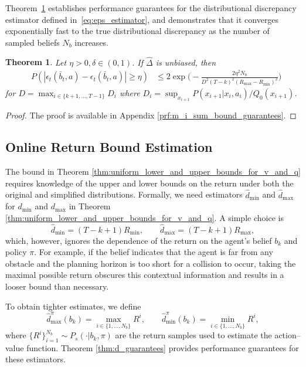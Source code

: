 \documentclass[acmlarge, manuscript, screen, review, natbib=false, oneside]{acmart}
\newtheorem{theorem}{Theorem}[section]
\begin{document}
Theorem~\ref{thm:m_i_sum_bound_guarantees} establishes performance guarantees for the distributional discrepancy estimator defined in~\eqref{eq:eps_estimator}, and demonstrates that it converges exponentially fast to the true distributional discrepancy as the number of sampled beliefs $N_b$ increases.
\begin{theorem}\label{thm:m_i_sum_bound_guarantees}
	Let $\eta>0,\delta\in (0,1)$. If $\hat{\Delta}$ is unbiased, then 
	\begin{equation}
		\begin{aligned}
			&P(|\hat{\epsilon}_t(\bar{b}_t, a)-\epsilon_t(\bar{b}_t, a)|\geq \eta) 
			&\leq 2\exp\Big( -\frac{2\eta^2 N_b}{D^2(T-k)^2(R_{\max}-R_{\min})^2} \Big)
		\end{aligned}
	\end{equation}
	for $D=\max_{i\in \{k+1,\dots,T-1\}} D_i$ where $D_i=\sup_{x_{i+1}}P(x_{i+1}|x_{i}, a_i)/Q_0(x_{i+1})$.
\end{theorem}
\begin{proof}
	The proof is available in Appendix \ref{prf:m_i_sum_bound_guarantees}.
\end{proof}

\subsection{Online Return Bound Estimation}\label{sec:return_bound_estimation}
The bound in Theorem \ref{thm:uniform_lower_and_upper_bounds_for_v_and_q} requires knowledge of the upper and lower bounds on the return under both the original and simplified distributions. Formally, we need estimators $\hat{d}_{\min}$ and $\hat{d}_{\max}$ for $d_{\min}$ and $d_{\max}$ in Theorem \ref{thm:uniform_lower_and_upper_bounds_for_v_and_q}. A simple choice is
\begin{equation}\label{eq:trivial_d}
	\hat{d}_{\min} = (T-k+1) R_{\min}, \qquad
	\hat{d}_{\max} = (T-k+1) R_{\max},
\end{equation}
which, however, ignores the dependence of the return on the agent's belief $b_k$ and policy $\pi$. For example, if the belief indicates that the agent is far from any obstacle and the planning horizon is too short for a collision to occur, taking the maximal possible return obscures this contextual information and results in a looser bound than necessary.  

To obtain tighter estimates, we define
\begin{equation}
	\hat{d}_{\max}^\pi(b_k) = \max_{i \in \{1,\dots,N_b\}} R^i, 
	\qquad
	\hat{d}_{\min}^\pi(b_k) = \min_{i \in \{1,\dots,N_b\}} R^i,
\end{equation}
where $\{R^i\}_{i=1}^{N_b} \sim P_s(\cdot | b_k, \pi)$ are the return samples used to estimate the action--value function. Theorem \ref{thm:d_guarantees} provides performance guarantees for these estimators.
\end{document}

